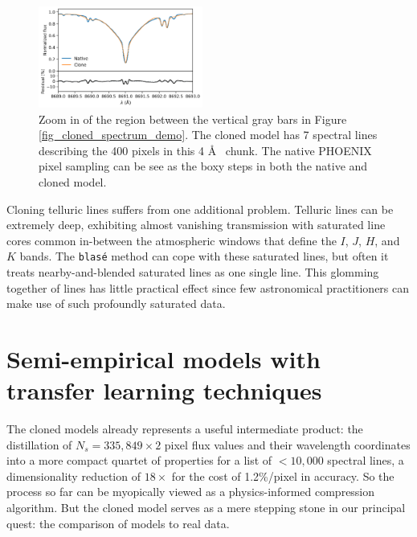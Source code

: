 \documentclass[twocolumn]{aastex631}
\begin{document}
\begin{figure}[hbt!]
    \centering
    \includegraphics[width=0.48\textwidth]{figures/blase_clone_demo_zoom.png}
    \caption{Zoom in of the region between the vertical gray bars in Figure \ref{fig_cloned_spectrum_demo}. The cloned model has 7 spectral lines describing the 400 pixels in this 4 \AA~ chunk.  The native PHOENIX pixel sampling can be see as the boxy steps in both the native and cloned model.  }
    \label{fig_zoom_cloning_performance}
\end{figure}

Cloning telluric lines suffers from one additional problem.  Telluric lines can be extremely deep, exhibiting almost vanishing transmission with saturated line cores common in-between the atmospheric windows that define the $I$, $J$, $H$, and $K$ bands.  The \texttt{blas\'e} method can cope with these saturated lines, but often it treats nearby-and-blended saturated lines as one single line.  This glomming together of lines has little practical effect since few astronomical practitioners can make use of such profoundly saturated data.


\section{Semi-empirical models with transfer learning techniques}\label{transferLearn}


The cloned models already represents a useful intermediate product: the distillation of $N_s=335,849\times2$ pixel flux values and their wavelength coordinates into a more compact quartet of properties for a list of $<10,000$ spectral lines, a dimensionality reduction of $18\times$ for the cost of 1.2\%/pixel in accuracy.  So the process so far can be myopically viewed as a physics-informed compression algorithm.  But the cloned model serves as a mere stepping stone in our principal quest: the comparison of models to real data.
\end{document}

